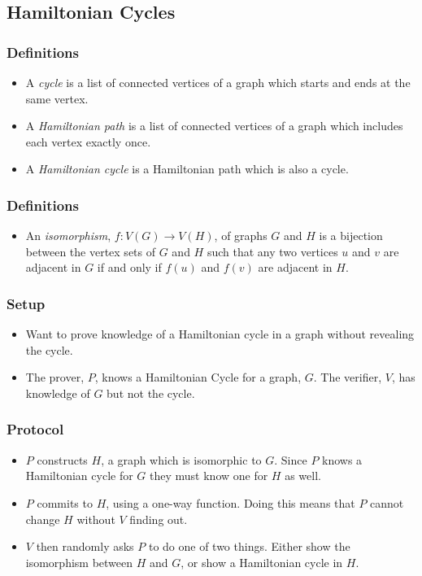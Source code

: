 \documentclass{beamer}
\begin{document}
\subsection{Hamiltonian Cycles}

\begin{frame}
	\frametitle{Definitions}
	\begin{itemize}
		\item A \textit{cycle} is a list of connected vertices of a graph
		which starts and ends at the same vertex. 
		
		\item A \textit{Hamiltonian path} is a list of connected vertices of a
		graph which includes each vertex exactly once.
		
		\item A \textit{Hamiltonian cycle} is a Hamiltonian path which is also
		a cycle.
		
	\end{itemize}
\end{frame}

\begin{frame}
	\frametitle{Definitions}
	\begin{itemize}
		\item An \textit{isomorphism}, $f: V(G) \rightarrow V(H)$, of graphs 
		$G$ and $H$ is a 
		bijection between the vertex
		sets of $G$ and $H$ such that any two vertices $u$ and $v$ are
		adjacent in $G$ if and only if $f(u)$ and $f(v)$ are adjacent in $H$.
	\end{itemize}
\end{frame}

\begin{frame}
	\frametitle{Setup}
	\begin{itemize}
		\item Want to prove knowledge of a Hamiltonian cycle in a graph without
		revealing the cycle.
		
		\item The prover, $P$, knows a Hamiltonian Cycle for a graph, $G$.
		The 	verifier, $V$, has knowledge of $G$ but not the cycle.
	\end{itemize}
\end{frame}

\begin{frame}
	\frametitle{Protocol}
	\begin{itemize}
		\item $P$ constructs $H$, a graph which
		is isomorphic to $G$. Since $P$ knows a Hamiltonian cycle
		for $G$ they must know one for $H$ as well.
		
		\item $P$ commits to $H$, using a one-way function. Doing this 
		means that $P$ cannot change $H$ without $V$ finding	out.
		
		\item $V$ then randomly asks $P$ to do one of two things. Either show
		the isomorphism between $H$ and $G$, or show a Hamiltonian cycle in $H$.		
	\end{itemize}
\end{frame}
\end{document}
